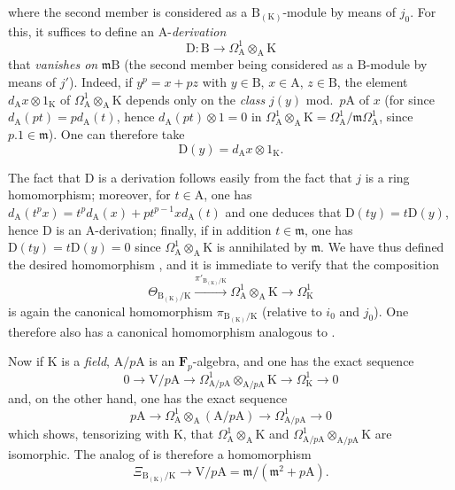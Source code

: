 \begin{remark}[22.4.8]
\[\]
where the second member is considered as a $\mathrm{B}_{(\mathrm{K})}$-module by means of $j_0$.
For this, it suffices to define an $\mathrm{A}$-\emph{derivation}
\[
\label{0.22.4.8.3}
  \mathrm{D}:\mathrm{B}\to\Omega^1_\mathrm{A}\otimes_\mathrm{A}\mathrm{K}
  \tag{22.4.8.3}
\]
that \emph{vanishes on} $\mathfrak{m}\mathrm{B}$ (the second member being considered as a $\mathrm{B}$-module by means of $j'$).
Indeed, if $y^p=x+pz$ with $y\in\mathrm{B}$, $x\in\mathrm{A}$, $z\in\mathrm{B}$, the element $d_\mathrm{A}x\otimes 1_\mathrm{K}$ of $\Omega^1_\mathrm{A}\otimes_\mathrm{A}\mathrm{K}$ depends only on the \emph{class} $j(y)$ mod.~$p\mathrm{A}$ of $x$ (for since $d_\mathrm{A}(pt)=pd_\mathrm{A}(t)$, hence $d_\mathrm{A}(pt)\otimes 1=0$ in $\Omega^1_\mathrm{A}\otimes_\mathrm{A}\mathrm{K}=\Omega^1_\mathrm{A}/\mathfrak{m}\Omega^1_\mathrm{A}$, since $p.1\in\mathfrak{m}$).
One can therefore take
\[
  \mathrm{D}(y)=d_\mathrm{A}x\otimes 1_\mathrm{K}.
\]

The fact that $\mathrm{D}$ is a derivation follows easily from the fact that $j$ is a ring homomorphism; moreover, for $t\in\mathrm{A}$, one has $d_\mathrm{A}(t^px)=t^pd_\mathrm{A}(x)+pt^{p-1}xd_\mathrm{A}(t)$ and one deduces that $\mathrm{D}(ty)=t\mathrm{D}(y)$, hence $\mathrm{D}$ is an $\mathrm{A}$-derivation; finally, if in addition $t\in\mathfrak{m}$, one has
$\mathrm{D}(ty)=t\mathrm{D}(y)=0$ since $\Omega^1_\mathrm{A}\otimes_\mathrm{A}\mathrm{K}$ is annihilated by $\mathfrak{m}$.
We have thus defined the desired homomorphism , and it is immediate to verify that the composition
\[
  \Theta_{\mathrm{B}_{(\mathrm{K})}/\mathrm{K}}\xrightarrow{\pi'_{\mathrm{B}_{(\mathrm{K})}/\mathrm{K}}}\Omega^1_\mathrm{A}\otimes_\mathrm{A}\mathrm{K}\to\Omega^1_\mathrm{K}
\]
is again the canonical homomorphism $\pi_{\mathrm{B}_{(\mathrm{K})}/\mathrm{K}}$ (relative to $i_0$ and $j_0$).
One therefore also has a canonical homomorphism analogous to .

Now if $\mathrm{K}$ is a \emph{field}, $\mathrm{A}/p\mathrm{A}$ is an $\mathbf{F}_p$-algebra, and one has the exact sequence 
\[
  0\to\mathrm{V}/p\mathrm{A}\to\Omega^1_{\mathrm{A}/p\mathrm{A}}\otimes_{\mathrm{A}/p\mathrm{A}}\mathrm{K}\to\Omega^1_\mathrm{K}\to 0
\]
and, on the other hand, one has the exact sequence 
\[
  p\mathrm{A}\to\Omega^1_\mathrm{A}\otimes_\mathrm{A}(\mathrm{A}/p\mathrm{A})\to\Omega^1_{\mathrm{A}/p\mathrm{A}}\to 0
\]
which shows, tensorizing with $\mathrm{K}$, that $\Omega^1_\mathrm{A}\otimes_\mathrm{A}\mathrm{K}$ and $\Omega^1_{\mathrm{A}/p\mathrm{A}}\otimes_{\mathrm{A}/p\mathrm{A}}\mathrm{K}$ are isomorphic.
The analog of  is therefore a homomorphism
\[
\label{0.22.4.8.4}
  \Xi_{\mathrm{B}_{(\mathrm{K})}/\mathrm{K}}\to\mathrm{V}/p\mathrm{A}=\mathfrak{m}/(\mathfrak{m}^2+p\mathrm{A}).
  \tag{22.4.8.4}
\]


\end{remark}
